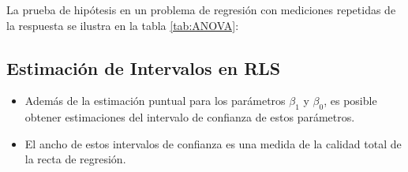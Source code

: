 \begin{itemize}
\begin{enumerate}
La prueba de hip\'otesis en un problema de regresi\'on con mediciones repetidas de la respuesta se ilustra en la tabla \ref{tab:ANOVA}:
\begin{table}[t!]
\begin{center}
\caption{An\'alisis de Varianza para la prueba $\beta_{1}=0$}
\label{tab:ANOVA}
\end{center}
\end{table}



\subsection*{Estimaci\'on de Intervalos en RLS}


\begin{itemize}
\item Adem\'as de la estimaci\'on puntual para los par\'ametros $\beta_{1}$ y $\beta_{0}$, es posible obtener estimaciones del intervalo de confianza de estos par\'ametros.

\item El ancho de estos intervalos de confianza es una medida de la calidad total de la recta de regresi\'on.

\end{itemize}





\end{enumerate}
\end{itemize}
